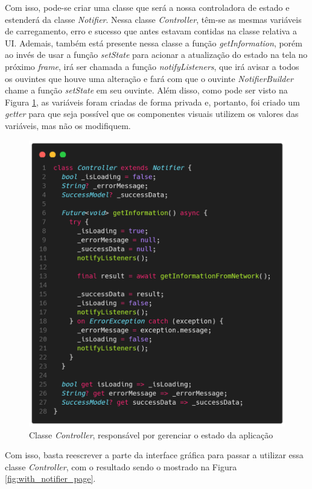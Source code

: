 \documentclass[12pt, %
openright, 
oneside, %
a4paper,    %
brazil]{facom-ufu-abntex2}
\begin{document}
Com isso, pode-se criar uma classe que será a nossa controladora de estado e estenderá da classe \textit{Notifier}. Nessa classe \textit{Controller}, têm-se as mesmas variáveis de carregamento, erro e sucesso que antes estavam contidas na classe relativa a UI. Ademais, também está presente nessa classe a função \textit{getInformation}, porém ao invés de usar a função \textit{setState} para acionar a atualização do estado na tela no próximo \textit{frame}, irá ser chamada a função \textit{notifyListeners}, que irá avisar a todos os ouvintes que houve uma alteração e fará com que o ouvinte \textit{NotifierBuilder} chame a função \textit{setState} em seu ouvinte. Além disso, como pode ser visto na Figura \ref{fig:notifier_controller}, as variáveis foram criadas de forma privada e, portanto, foi criado um \textit{getter} para que seja possível que os componentes visuais utilizem os valores das variáveis, mas não os modifiquem.

\begin{figure}[ht]
    \centering
    \includegraphics[width=.65\textwidth, trim={0 30 0 100}, clip]{figures/states/notifier_controller.png}
    \caption{Classe \textit{Controller}, responsável por gerenciar o estado da aplicação}
    \label{fig:notifier_controller}
\end{figure}

Com isso, basta reescrever a parte da interface gráfica para passar a utilizar essa classe \textit{Controller}, com o resultado sendo o mostrado na Figura \ref{fig:with_notifier_page}.
\end{document}
